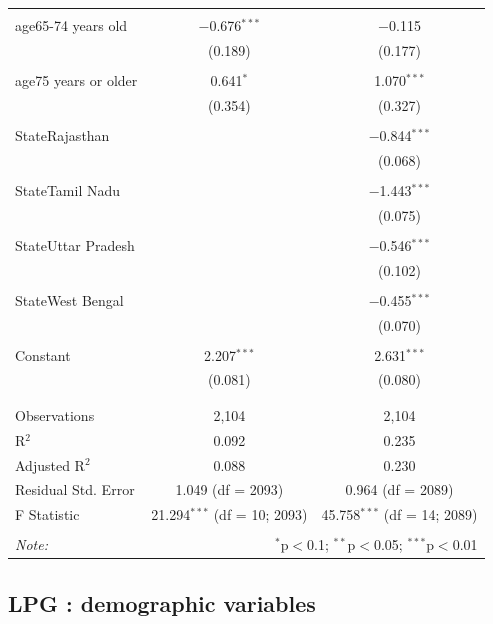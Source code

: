 \documentclass[
]{article}
\begin{document}
\begin{table}[!htbp]
\begin{tabular}{@{\extracolsep{5pt}}lcc}
  & & \\ 
 age65-74 years old & $-$0.676$^{***}$ & $-$0.115 \\ 
  & (0.189) & (0.177) \\ 
  & & \\ 
 age75 years or older & 0.641$^{*}$ & 1.070$^{***}$ \\ 
  & (0.354) & (0.327) \\ 
  & & \\ 
 StateRajasthan &  & $-$0.844$^{***}$ \\ 
  &  & (0.068) \\ 
  & & \\ 
 StateTamil Nadu &  & $-$1.443$^{***}$ \\ 
  &  & (0.075) \\ 
  & & \\ 
 StateUttar Pradesh &  & $-$0.546$^{***}$ \\ 
  &  & (0.102) \\ 
  & & \\ 
 StateWest Bengal &  & $-$0.455$^{***}$ \\ 
  &  & (0.070) \\ 
  & & \\ 
 Constant & 2.207$^{***}$ & 2.631$^{***}$ \\ 
  & (0.081) & (0.080) \\ 
  & & \\ 
\hline \\[-1.8ex] 
Observations & 2,104 & 2,104 \\ 
R$^{2}$ & 0.092 & 0.235 \\ 
Adjusted R$^{2}$ & 0.088 & 0.230 \\ 
Residual Std. Error & 1.049 (df = 2093) & 0.964 (df = 2089) \\ 
F Statistic & 21.294$^{***}$ (df = 10; 2093) & 45.758$^{***}$ (df = 14; 2089) \\ 
\hline 
\hline \\[-1.8ex] 
\textit{Note:}  & \multicolumn{2}{r}{$^{*}$p$<$0.1; $^{**}$p$<$0.05; $^{***}$p$<$0.01} \\ 
\end{tabular} 
\end{table} 
\endgroup

\hypertarget{lpg-demographic-variables}{%
\subsection{LPG : demographic
variables}\label{lpg-demographic-variables}}
\end{document}
